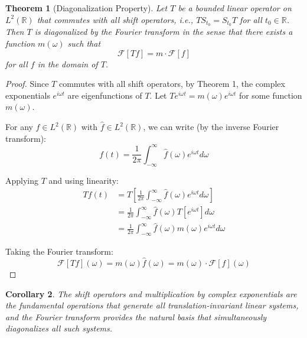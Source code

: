 \documentclass{article}
\theoremstyle{plain}
\newtheorem{theorem}{Theorem}
\newtheorem{corollary}[theorem]{Corollary}
\theoremstyle{definition}
\begin{document}
\begin{theorem}[Diagonalization Property]
Let $T$ be a bounded linear operator on $L^2(\mathbb{R})$ that commutes with all shift operators, i.e., $TS_{t_0} = S_{t_0}T$ for all $t_0 \in \mathbb{R}$. Then $T$ is diagonalized by the Fourier transform in the sense that there exists a function $m(\omega)$ such that
\[\mathcal{F}[Tf] = m \cdot \mathcal{F}[f]\]
for all $f$ in the domain of $T$.
\end{theorem}

\begin{proof}
Since $T$ commutes with all shift operators, by Theorem 1, the complex exponentials $e^{i\omega t}$ are eigenfunctions of $T$. Let $Te^{i\omega t} = m(\omega)e^{i\omega t}$ for some function $m(\omega)$.

For any $f \in L^2(\mathbb{R})$ with $\hat{f} \in L^2(\mathbb{R})$, we can write (by the inverse Fourier transform):
\[f(t) = \frac{1}{2\pi} \int_{-\infty}^{\infty} \hat{f}(\omega)e^{i\omega t} d\omega\]

Applying $T$ and using linearity:
\begin{align}
Tf(t) &= T\left[\frac{1}{2\pi} \int_{-\infty}^{\infty} \hat{f}(\omega)e^{i\omega t} d\omega\right] \\
&= \frac{1}{2\pi} \int_{-\infty}^{\infty} \hat{f}(\omega)T[e^{i\omega t}] d\omega \\
&= \frac{1}{2\pi} \int_{-\infty}^{\infty} \hat{f}(\omega)m(\omega)e^{i\omega t} d\omega
\end{align}

Taking the Fourier transform:
\[\mathcal{F}[Tf](\omega) = m(\omega)\hat{f}(\omega) = m(\omega) \cdot \mathcal{F}[f](\omega)\]
\end{proof}

\begin{corollary}
The shift operators and multiplication by complex exponentials are the fundamental operations that generate all translation-invariant linear systems, and the Fourier transform provides the natural basis that simultaneously diagonalizes all such systems.
\end{corollary}
\end{document}
